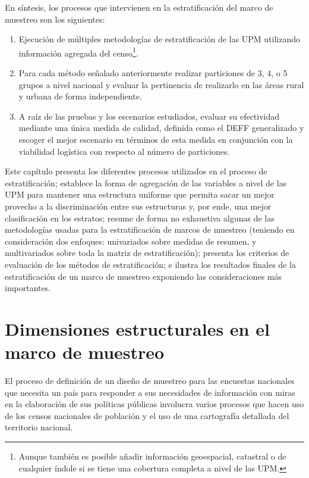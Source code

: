 \documentclass[
  12pt,
]{book}
\providecommand{\tightlist}{%
  \setlength{\itemsep}{0pt}\setlength{\parskip}{0pt}}
\begin{document}
En síntesis, los procesos que intervienen en la estratificación del marco de muestreo son los siguientes:

\begin{enumerate}
\def\labelenumi{\arabic{enumi}.}
\tightlist
\item
  Ejecución de múltiples metodologías de estratificación de las UPM utilizando información agregada del censo\footnote{Aunque también es posible añadir información geoespacial, catastral o de cualquier índole si se tiene una cobertura completa a nivel de las UPM.}.
\item
  Para cada método señalado anteriormente realizar particiones de 3, 4, o 5 grupos a nivel nacional y evaluar la pertinencia de realizarlo en las áreas rural y urbana de forma independiente.
\item
  A raíz de las pruebas y los escenarios estudiados, evaluar su efectividad mediante una única medida de calidad, definida como el DEFF generalizado y escoger el mejor escenario en términos de esta medida en conjunción con la viabilidad logística con respecto al número de particiones.
\end{enumerate}

Este capítulo presenta los diferentes procesos utilizados en el proceso de estratificación; establece la forma de agregación de las variables a nivel de las UPM para mantener una estructura uniforme que permita sacar un mejor provecho a la discriminación entre sus estructuras y, por ende, una mejor clasificación en los estratos; resume de forma no exhaustiva algunas de las metodologías usadas para la estratificación de marcos de muestreo (teniendo en consideración dos enfoques: univariados sobre medidas de resumen, y multivariados sobre toda la matriz de estratificación); presenta los criterios de evaluación de los métodos de estratificación; e ilustra los resultados finales de la estratificación de un marco de muestreo exponiendo las consideraciones más importantes.

\hypertarget{dimensiones-estructurales-en-el-marco-de-muestreo}{%
\section{Dimensiones estructurales en el marco de muestreo}\label{dimensiones-estructurales-en-el-marco-de-muestreo}}

El proceso de definición de un diseño de muestreo para las encuestas nacionales que necesita un país para responder a sus necesidades de información con miras en la elaboración de sus políticas públicas involucra varios procesos que hacen uso de los censos nacionales de población y el uso de una cartografía detallada del territorio nacional.
\end{document}
